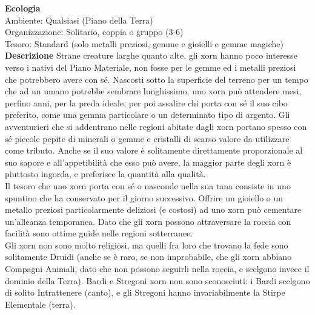 \begin{multicols}{2}
\textbf{Ecologia}\\
Ambiente: Qualsiasi (Piano della Terra)\\
Organizzazione: Solitario, coppia o gruppo (3-6)\\
Tesoro: Standard (solo metalli preziosi, gemme e gioielli e gemme magiche)\\
\textbf{Descrizione}
Strane creature larghe quanto alte, gli xorn hanno poco interesse verso i nativi del Piano Materiale, non fosse per le gemme ed i metalli preziosi che potrebbero avere con sé. Nascosti sotto la superficie del terreno per un tempo che ad un umano potrebbe sembrare lunghissimo, uno xorn può attendere mesi, perfino anni, per la preda ideale, per poi assalire chi porta con sé il suo cibo preferito, come una gemma particolare o un determinato tipo di argento. Gli avventurieri che si addentrano nelle regioni abitate dagli xorn portano spesso con sé piccole pepite di minerali o gemme e cristalli di scarso valore da utilizzare come tributo. Anche se il suo valore è solitamente direttamente proporzionale al suo sapore e all'appetibilità che esso può avere, la maggior parte degli xorn è piuttosto ingorda, e preferisce la quantità alla qualità.\\

Il tesoro che uno xorn porta con sé o nasconde nella sua tana consiste in uno spuntino che ha conservato per il giorno successivo. Offrire un gioiello o un metallo preziosi particolarmente deliziosi (e costosi) ad uno xorn può cementare un’alleanza temporanea. Dato che gli xorn possono attraversare la roccia con facilità sono ottime guide nelle regioni sotterranee.\\

Gli xorn non sono molto religiosi, ma quelli fra loro che trovano la fede sono solitamente Druidi (anche se è raro, se non improbabile, che gli xorn abbiano Compagni Animali, dato che non possono seguirli nella roccia, e scelgono invece il dominio della Terra). Bardi e Stregoni xorn non sono sconosciuti: i Bardi scelgono di solito Intrattenere (canto), e gli Stregoni hanno invariabilmente la Stirpe Elementale (terra).\\


\end{multicols}
